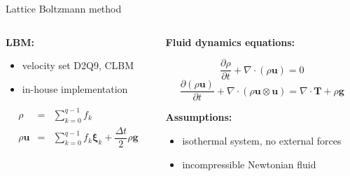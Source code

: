 \documentclass[aspectratio=169,xcolor=dvipsnames]{beamer}
\newcommand{\vect}[1]{\mathbf{#1}}
\begin{document}
\begin{frame}{Lattice Boltzmann method}
	\begin{columns}[T] %
		\begin{column}{.45\textwidth}
			\textbf{LBM:}\\
			\begin{itemize}
				\item velocity set D2Q9, CLBM
				\item in-house implementation
			\end{itemize}
		\begin{eqnarray*}
			\rho &=& \sum_{k=0}^{q-1} f_{k}\\[3pt]
			\rho \vect{u} &=& \sum_{k=0}^{q-1} f_{k} \boldsymbol{\xi}_{k} + \dfrac{\Delta t}{2} \rho \boldsymbol{g}
		\end{eqnarray*}
		\end{column}%
		\begin{column}{.5\textwidth}
			\textbf{Fluid dynamics equations:}
			\vspace{-13pt}
			\begin{center}
				$$\frac{\partial \rho}{\partial t} + \nabla \cdot (\rho \vect{u}) = 0 $$
				$$\frac{\partial (\rho \vect{u})}{\partial t} + \nabla \cdot (\rho \vect{u} \otimes \vect{u}) = \nabla \cdot \mathbf{T} + \rho \boldsymbol{g}$$
			\end{center}%
			\vspace{11pt}
			\textbf{Assumptions:}\\[2pt]
			\begin{itemize}
				\item isothermal system, no external forces
				\item incompressible Newtonian ﬂuid
			\end{itemize}
		\end{column}%
	\end{columns}
\end{frame}
\end{document}
